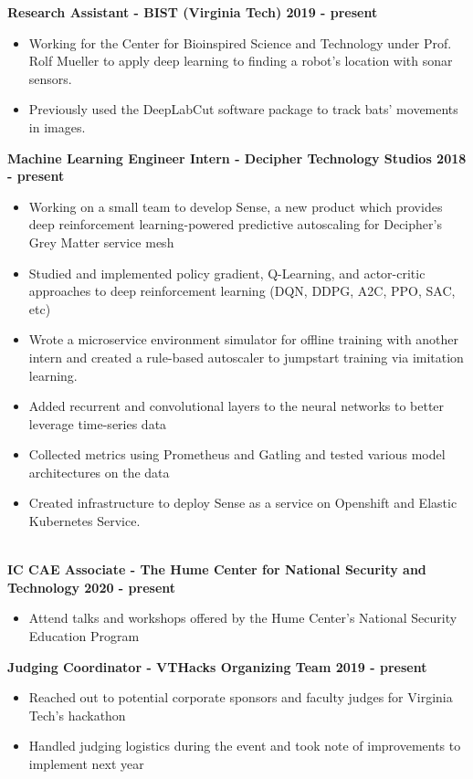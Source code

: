 \documentclass{article}
\begin{document}
\begin{center}
\begin{flushleft}
    \textbf{Research Assistant - BIST (Virginia Tech) \hfill 2019 - present}
    \begin{itemize}
      \itemsep0em
      \item Working for the Center for Bioinspired Science and Technology under Prof. Rolf Mueller to apply deep learning to finding a robot's location with sonar sensors.
      \item Previously used the DeepLabCut software package to track bats' movements in images. 
    \end{itemize}


    \textbf{Machine Learning Engineer Intern - Decipher Technology Studios \hfill 2018 - present}
    \begin{itemize}
      \itemsep0em
      \item Working on a small team to develop Sense, a new product which provides deep reinforcement learning-powered predictive autoscaling for Decipher’s Grey Matter service mesh
      \item Studied and implemented policy gradient, Q-Learning, and actor-critic approaches to deep reinforcement learning (DQN, DDPG, A2C, PPO, SAC, etc)
      \item Wrote a microservice environment simulator for offline training with another intern and created a rule-based autoscaler to jumpstart training via imitation learning.
      \item Added recurrent and convolutional layers to the neural networks to better leverage time-series data
      \item Collected metrics using Prometheus and Gatling and tested various model architectures on the data
      \item Created infrastructure to deploy Sense as a service on Openshift and Elastic Kubernetes Service.
    \end{itemize}


    {\large\textbf{\underline{}}} \\

    \textbf{IC CAE Associate - The Hume Center for National Security and Technology \hfill 2020 - present}
    \begin{itemize}
      \itemsep0em
      \item Attend talks and workshops offered by the Hume Center's National Security Education Program 
    \end{itemize}
    
    \textbf{Judging Coordinator - VTHacks Organizing Team \hfill 2019 - present}
    \begin{itemize}
      \itemsep0em
      \item Reached out to potential corporate sponsors and faculty judges for Virginia Tech's hackathon
      \item Handled judging logistics during the event and took note of improvements to implement next year
    \end{itemize}
    

\end{flushleft}
\end{center}
\end{document}
